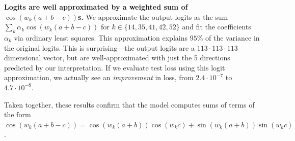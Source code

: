 \documentclass{article} %
\newcommand{\cosp}[1]{\cos \left ( #1 \right )}
\newcommand{\sinp}[1]{\sin \left ( #1 \right )}
\newcommand{\keyfreqs}{\{14, 35, 41, 42, 52\}}
\begin{document}
\textbf{Logits are well approximated by a weighted sum of $\cosp{w_k (a+b-c)}$s.} We approximate the output logits as the sum $\sum_{k} \alpha_k\cos(w_k(a+b-c))$ for $k \in \keyfreqs$ and fit the coefficients $\alpha_k$ via ordinary least squares. This approximation explains $95\%$ of the variance in the original logits. This is surprising---the output logits are a $113 \cdot 113 \cdot 113$ dimensional vector, but are well-approximated with just the 5 directions predicted by our interpretation. If we evaluate test loss using this logit approximation, we actually see an \emph{improvement} in loss, from $2.4 \cdot 10^{-7}$ to $4.7 \cdot 10^{-8}$. 

Taken together, these results confirm that the model computes sums of terms of the form $\cosp{w_k(a+b-c)} = \cosp{w_k (a+b)}\cosp{w_k c} + \sinp{w_k(a+b)}\sinp{w_k c}$. 
\end{document}
